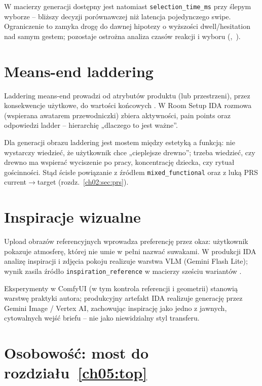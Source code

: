 W macierzy generacji dostępny jest natomiast \texttt{selection\_time\_ms} przy ślepym wyborze -- bliższy decyzji porównawczej niż latencja pojedynczego swipe.
Ograniczenie to zamyka drogę do dawnej hipotezy o wyższości dwell/hesitation nad samym gestem; pozostaje ostrożna analiza czasów reakcji i wyboru (,~).

\section{Means-end laddering}
\label{ch03:sec:laddering}

Laddering means-end prowadzi od atrybutów produktu (lub przestrzeni), przez konsekwencje użytkowe, do wartości końcowych \parencite{reynolds1988laddering}.
W Room Setup IDA rozmowa (wspierana awatarem przewodniczki) zbiera aktywności, pain points oraz odpowiedzi ladder -- hierarchię „dlaczego to jest ważne”.

Dla generacji obrazu laddering jest mostem między estetyką a funkcją: nie wystarczy wiedzieć, że użytkownik chce „cieplejsze drewno”; trzeba wiedzieć, czy drewno ma wspierać wyciszenie po pracy, koncentrację dziecka, czy rytuał gościnności.
Stąd ścisłe powiązanie z źródłem \texttt{mixed\_functional} oraz z luką PRS current$\rightarrow$target (rozdz.~\ref{ch02:sec:prs}).

\section{Inspiracje wizualne}
\label{ch03:sec:inspiracje}

Upload obrazów referencyjnych wprowadza preferencję przez okaz: użytkownik pokazuje atmosferę, której nie umie w pełni nazwać suwakami.
W produkcji IDA analizę inspiracji i zdjęcia pokoju realizuje warstwa VLM (Gemini Flash Lite); wynik zasila źródło \texttt{inspiration\_reference} w macierzy sześciu wariantów \parencite{idaPlatform2026}.

Eksperymenty w ComfyUI (w tym kontrola referencji i geometrii) stanowią warstwę praktyki autora; produkcyjny artefakt IDA realizuje generację przez Gemini Image / Vertex AI, zachowując inspirację jako jedno z jawnych, cytowalnych wejść briefu -- nie jako niewidzialny styl transferu.

\section{Osobowość: most do rozdziału~\ref{ch05:top}}
\label{ch03:sec:bigfive-bridge}

